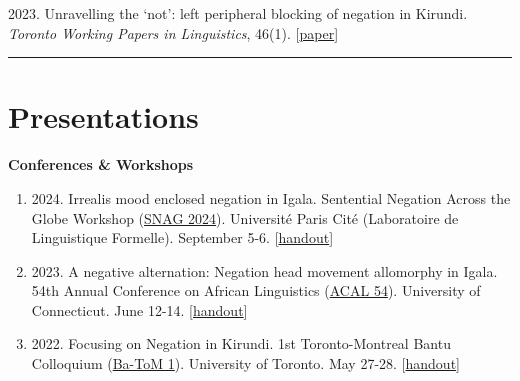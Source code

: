 \documentclass[margin,line]{resume}
\begin{document}
\begin{resume}
	 {2023. Unravelling the `not': left peripheral blocking of negation in Kirundi. \textit{Toronto Working Papers in Linguistics}, 46(1). [\href{https://twpl.library.utoronto.ca/index.php/twpl/article/view/39257}{paper}]}%

	\vspace{-0.9em}\rule{\textwidth}{0.4pt}


	\vspace{-0.5em}

	\section{\mysidestyle Presentations}

	\textbf{Conferences \& Workshops}
	\begin{enumerate}[-, leftmargin=1em, topsep=2pt]
		
		\item[] {2024. Irrealis mood enclosed negation in Igala. Sentential Negation Across the Globe Workshop (\href{https://parissnag.com/conf}{SNAG 2024}). Universit\'{e} Paris Cit\'{e} (Laboratoire de Linguistique Formelle). September 5-6. [\href{https://parissnag.com/conf/program/chaperon}{handout}]}
		
		\item[] {2023. A negative alternation: Negation head movement allomorphy in Igala. 54th Annual Conference on African Linguistics (\href{https://uconnuecs.cventevents.com/event/aef2d257-6a6a-41b5-b83d-2c6efc60aac5/summary}{ACAL 54}). University of Connecticut. June 12-14. [\href{run:../handouts/chaperon_ACAL54_Igala_Negation-handout.pdf}{handout}]}
		
		\item[] {2022. Focusing on Negation in Kirundi. 1st Toronto-Montreal Bantu Colloquium (\href{https://mcling.blogs.mcgill.ca/2022/05/24/mcgill-at-ba-tom-1/}{Ba-ToM 1}). University of Toronto. May 27-28. [\href{run:../handouts/chaperon_batom_kirundi_negn-handout.pdf}{handout}]}
	\end{enumerate}
	
\begin{comment}
	\textbf{Reading Group \& Labs}
	\begin{enumerate}[-, leftmargin=1em, topsep=2pt]
		\item[] {2023. \href{https://mcling.blogs.mcgill.ca/2023/01/15/mull-lab-1-17-brandon-chaperon/}{A negative alternation: Negation head movement allomorphy in Igala}. \href{https://mull-lab.org/}{MULL Lab} meeting. McGill University. January 17.}


\end{comment}
\end{resume}
\end{document}
